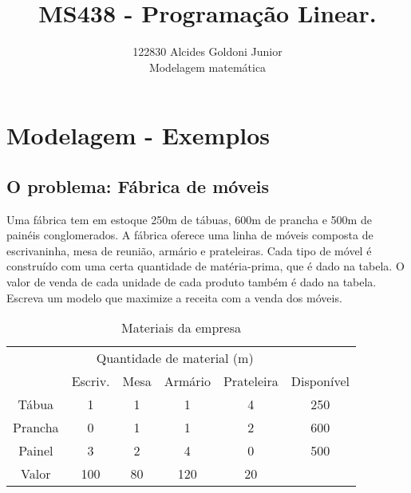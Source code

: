 \documentclass[a4paper]{article}
\title{MS438 - Programa\c{c}\~ao Linear.}
\author{122830 Alcides Goldoni Junior\\
  \small Modelagem matem\'{a}tica \\
}%
\begin{document}
\maketitle
\section{Modelagem - Exemplos}
\subsection{O problema: F\'abrica de m\'oveis}
Uma f\'abrica tem em estoque 250m de t\'abuas, 600m de prancha e 500m de pain\'eis conglomerados. A f\'abrica oferece uma linha de m\'oveis composta de escrivaninha, mesa de reuni\~ao, arm\'ario e prateleiras. Cada tipo de m\'ovel é constru\'ido com uma certa quantidade de mat\'eria-prima, que \'e dado na tabela. O valor de venda de cada unidade de cada produto tamb\'em é dado na tabela.
\\
Escreva um modelo que maximize a receita com a venda dos m\'oveis.
\\
\begin{table}[]
\centering
\caption{Materiais da empresa}
\label{my-label}
\begin{tabular}{c|c|c|c|c|c}
\cline{2-5}
& \multicolumn{4}{c|}{Quantidade de material (m)} & \\ 
\cline{2-6} 
& Escriv.    & Mesa    & Arm\'ario   & Prateleira   & \multicolumn{1}{c|}{Dispon\'ivel} \\ 
\hline
\multicolumn{1}{|c|}{T\'abua}   & 1          & 1       & 1         & 4            & \multicolumn{1}{c|}{250}        \\ \hline
\multicolumn{1}{|c|}{Prancha} & 0          & 1       & 1         & 2            & \multicolumn{1}{c|}{600}        \\ \hline
\multicolumn{1}{|c|}{Painel}  & 3          & 2       & 4         & 0            & \multicolumn{1}{c|}{500}        \\ \hline
\multicolumn{1}{|c|}{Valor}   & 100        & 80      & 120       & 20           &                                 \\ \cline{1-5}
\end{tabular}
\end{table}
\\
\end{document}

